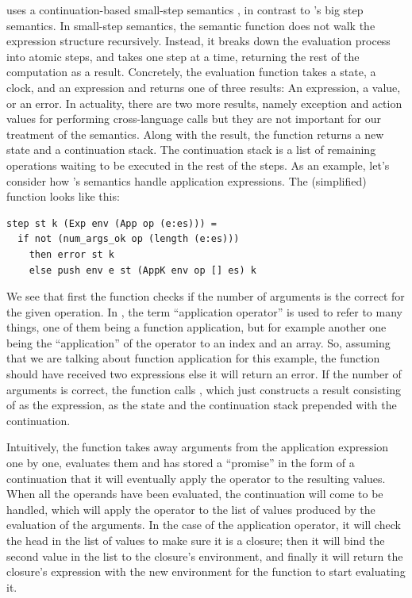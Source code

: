 \StateLang{} uses a continuation-based small-step semantics
\cite{nakata2009small}, in contrast to \ThunkLang{}'s big step semantics. In
small-step semantics, the semantic function does not walk the expression
structure recursively. Instead, it breaks down the evaluation process into
atomic steps, and takes one step at a time, returning the rest of the
computation as a result. Concretely, the evaluation function takes a state, a
clock, and an expression and returns one of three results: An expression, a
value, or an error. In actuality, there are two more results, namely exception
and action values for performing cross-language calls but they are not important
for our treatment of the semantics. Along with the result, the 
function returns a new state and a continuation stack. The continuation stack is
a list of remaining operations waiting to be executed in the rest of the steps.
As an example, let's consider how \StateLang{}'s semantics handle application
expressions. The (simplified)  function looks like this:

\begin{verbatim}
step st k (Exp env (App op (e:es))) =
  if not (num_args_ok op (length (e:es)))
    then error st k
    else push env e st (AppK env op [] es) k
\end{verbatim}

We see that first the function checks if the number of arguments is the correct
for the given operation. In \StateLang{}, the term ``application operator'' is
used to refer to many things, one of them being a function application, but for
example another one being the ``application'' of the  operator to an
index and an array. So, assuming that we are talking about function application
for this example, the  function should have received two expressions
else it will return an error. If the number of arguments is correct, the
function calls , which just constructs a result consisting of 
as the expression,  as the state and the continuation stack 
prepended with the  continuation.

Intuitively, the  function takes away arguments from the application
expression one by one, evaluates them and has stored a ``promise'' in the form
of a continuation that it will eventually apply the operator to the resulting
values. When all the operands have been evaluated, the  continuation
will come to be handled, which will apply the operator to the list of values
produced by the evaluation of the arguments. In the case of the application
operator, it will check the head in the list of values to make sure it is a
closure; then it will bind the second value in the list to the closure's
environment, and finally it will return the closure's expression with the new
environment for the  function to start evaluating it.

